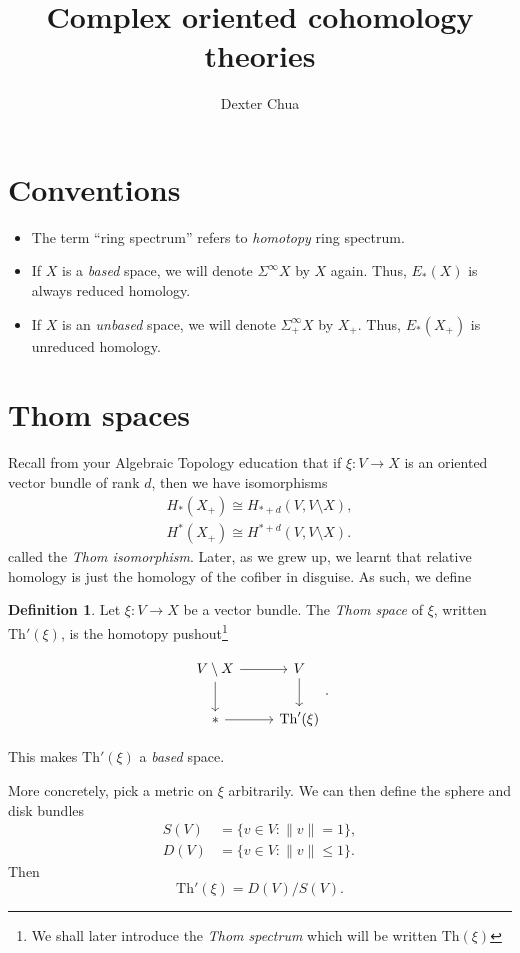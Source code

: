 \documentclass{shortart}
\title{Complex oriented cohomology theories}
\author{Dexter Chua}
\theoremstyle{definition}
\newtheorem{defi}[thm]{Definition}
\newcommand\Th{\mathrm{Th}}
\begin{document}
\section*{Conventions}
\begin{itemize}
  \item The term ``ring spectrum'' refers to \emph{homotopy} ring spectrum.
  \item If $X$ is a \emph{based} space, we will denote $\Sigma^\infty X$ by $X$ again. Thus, $E_*(X)$ is always reduced homology.
  \item If $X$ is an \emph{unbased} space, we will denote $\Sigma^\infty_+ X$ by $X_+$. Thus, $E_*(X_+)$ is unreduced homology.
\end{itemize}

\section{Thom spaces}
Recall from your Algebraic Topology education that if $\xi: V \to X$ is an oriented vector bundle of rank $d$, then we have isomorphisms
\[
  \begin{aligned}
    H_*(X_+) \cong H_{* + d}(V, V \setminus X),\\
    H^*(X_+) \cong H^{* + d}(V, V \setminus X).
  \end{aligned}
\]
called the \emph{Thom isomorphism}. Later, as we grew up, we learnt that relative homology is just the homology of the cofiber in disguise. As such, we define

\begin{defi}
  Let $\xi: V \to X$ be a vector bundle. The \emph{Thom space} of $\xi$, written $\Th'(\xi)$, is the homotopy pushout\footnote{We shall later introduce the \emph{Thom spectrum} which will be written $\Th(\xi)$}
  \begin{useimager}
    \[
      \begin{tikzcd}
        V \setminus X \ar[r] \ar[d] & V \ar[d]\\
        * \ar[r] & \Th'(\xi)
      \end{tikzcd}.
    \]
  \end{useimager}
  This makes $\Th'(\xi)$ a \emph{based} space.

  More concretely, pick a metric on $\xi$ arbitrarily. We can then define the sphere and disk bundles
  \[
    \begin{aligned}
      S(V) &= \{v \in V: \|v\| = 1\},\\
      D(V) &= \{v \in V: \|v\| \leq 1\}.
    \end{aligned}
  \]
  Then
  \[
    \Th'(\xi) = D(V)/S(V).
  \]
\end{defi}
\end{document}
